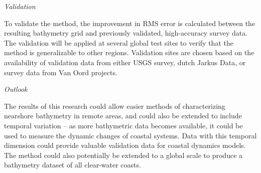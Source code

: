 \noindent\emph{Validation}

\noindent To validate the method, the improvement in RMS error is calculated between the resulting bathymetry grid and previously validated, high-accuracy survey data. The validation will be applied at several global test sites to verify that the method is generalizable to other regions. Validation sites are chosen based on the availability of validation data from either USGS survey, dutch Jarkus Data, or survey data from Van Oord projects. 

\noindent\emph{Outlook} 

\noindent The results of this research could allow easier methods of characterizing nearshore bathymetry in remote areas, and could also be extended to include temporal variation – as more bathymetric data becomes available, it could be used to measure the dynamic changes of coastal systems. Data with this temporal dimension could provide valuable validation data for coastal dynamics models. The method could also potentially be extended to a global scale to produce a bathymetry dataset of all clear-water coasts.
